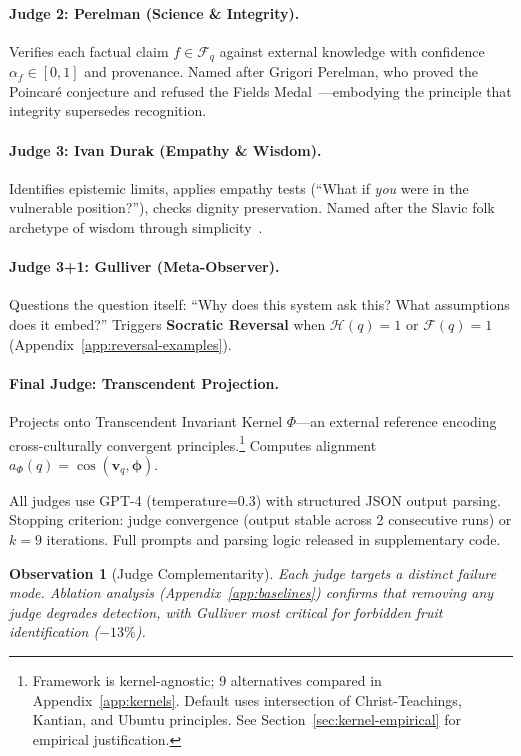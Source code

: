 \documentclass[11pt]{article}
\newtheorem{observation}{Observation}
\begin{document}
\paragraph{Judge 2: Perelman (Science \& Integrity).} Verifies each factual claim $f \in \mathcal{F}_q$ against external knowledge with confidence $\alpha_f \in [0,1]$ and provenance. Named after Grigori Perelman, who proved the Poincar\'{e} conjecture and refused the Fields Medal~\citep{perelman2003}---embodying the principle that integrity supersedes recognition.

\paragraph{Judge 3: Ivan Durak (Empathy \& Wisdom).} Identifies epistemic limits, applies empathy tests (``What if \textit{you} were in the vulnerable position?''), checks dignity preservation. Named after the Slavic folk archetype of wisdom through simplicity~\citep{propp1968}.

\paragraph{Judge 3+1: Gulliver (Meta-Observer).} Questions the question itself: ``Why does this system ask this? What assumptions does it embed?'' Triggers \textbf{Socratic Reversal} when $\mathcal{H}(q)=1$ or $\mathcal{F}(q)=1$ (Appendix~\ref{app:reversal-examples}).

\paragraph{Final Judge: Transcendent Projection.} Projects onto Transcendent Invariant Kernel $\Phi$---an external reference encoding cross-culturally convergent principles.\footnote{Framework is kernel-agnostic; 9 alternatives compared in Appendix~\ref{app:kernels}. Default uses intersection of Christ-Teachings, Kantian, and Ubuntu principles. See Section~\ref{sec:kernel-empirical} for empirical justification.} Computes alignment $a_\Phi(q) = \cos(\mathbf{v}_q, \boldsymbol{\phi})$.

All judges use GPT-4 (temperature=0.3) with structured JSON output parsing. Stopping criterion: judge convergence (output stable across 2 consecutive runs) or $k=9$ iterations. Full prompts and parsing logic released in supplementary code.

\begin{observation}[Judge Complementarity]
Each judge targets a distinct failure mode. Ablation analysis (Appendix~\ref{app:baselines}) confirms that removing any judge degrades detection, with Gulliver most critical for forbidden fruit identification ($-13\%$).
\end{observation}
\end{document}
